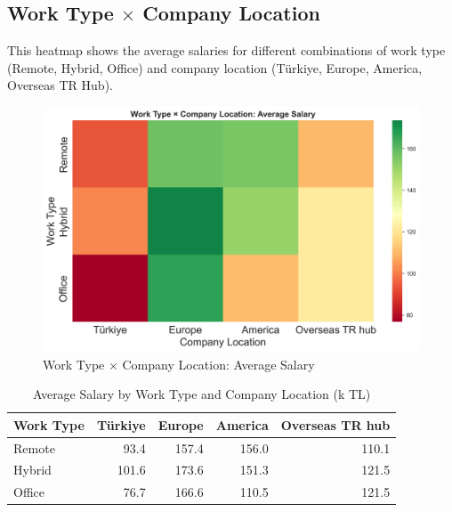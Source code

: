 \documentclass[12pt,a4paper]{article}
\begin{document}
\subsection{Work Type \texorpdfstring{\(\times\)}{x} Company Location}
This heatmap shows the average salaries for different combinations of work type (Remote, Hybrid, Office) and company location (Türkiye, Europe, America, Overseas TR Hub).

\begin{figure}[H]
	\centering
	\includegraphics[width=\textwidth]{figures/heatmap_worktype_location_salary.png}
	\caption{Work Type $\times$ Company Location: Average Salary}
\end{figure}

\begin{table}[H]
	\centering
	\small
	\begin{tabular}{lrrrr}
		\toprule
		\textbf{Work Type} & \textbf{Türkiye} & \textbf{Europe} & \textbf{America} & \textbf{Overseas TR hub} \\
		\midrule
		Remote             & 93.4              & 157.4           & 156.0            & 110.1                    \\
		Hybrid             & 101.6             & 173.6           & 151.3            & 121.5                    \\
		Office             & 76.7              & 166.6           & 110.5            & 121.5                    \\
		\bottomrule
	\end{tabular}
	\caption{Average Salary by Work Type and Company Location (k TL)}
\end{table}
\end{document}
